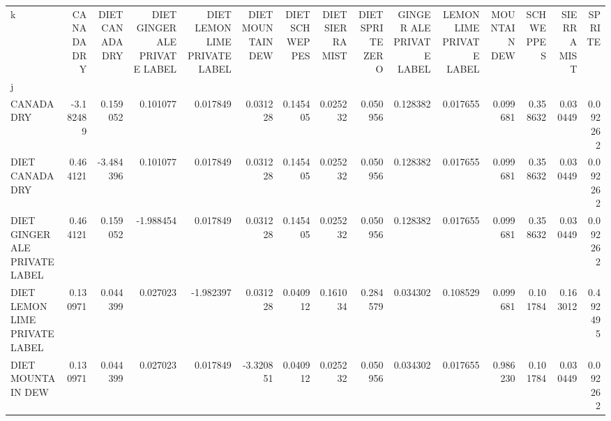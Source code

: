 \begin{tabular}{lrrrrrrrrrrrrrr}
\toprule
k &  CANADA DRY &  DIET CANADA DRY &  DIET GINGER ALE PRIVATE LABEL &  DIET LEMON LIME PRIVATE LABEL &  DIET MOUNTAIN DEW &  DIET SCHWEPPES &  DIET SIERRA MIST &  DIET SPRITE ZERO &  GINGER ALE PRIVATE LABEL &  LEMON LIME PRIVATE LABEL &  MOUNTAIN DEW &  SCHWEPPES &  SIERRA MIST &    SPRITE \\
j                             &             &                  &                                &                                &                    &                 &                   &                   &                           &                           &               &            &              &           \\
\midrule
CANADA DRY                    &   -3.182489 &         0.159052 &                       0.101077 &                       0.017849 &           0.031228 &        0.145405 &          0.025232 &          0.050956 &                  0.128382 &                  0.017655 &      0.099681 &   0.358632 &     0.030449 &  0.092262 \\
DIET CANADA DRY               &    0.464121 &        -3.484396 &                       0.101077 &                       0.017849 &           0.031228 &        0.145405 &          0.025232 &          0.050956 &                  0.128382 &                  0.017655 &      0.099681 &   0.358632 &     0.030449 &  0.092262 \\
DIET GINGER ALE PRIVATE LABEL &    0.464121 &         0.159052 &                      -1.988454 &                       0.017849 &           0.031228 &        0.145405 &          0.025232 &          0.050956 &                  0.128382 &                  0.017655 &      0.099681 &   0.358632 &     0.030449 &  0.092262 \\
DIET LEMON LIME PRIVATE LABEL &    0.130971 &         0.044399 &                       0.027023 &                      -1.982397 &           0.031228 &        0.040912 &          0.161034 &          0.284579 &                  0.034302 &                  0.108529 &      0.099681 &   0.101784 &     0.163012 &  0.492495 \\
DIET MOUNTAIN DEW             &    0.130971 &         0.044399 &                       0.027023 &                       0.017849 &          -3.320851 &        0.040912 &          0.025232 &          0.050956 &                  0.034302 &                  0.017655 &      0.986230 &   0.101784 &     0.030449 &  0.092262 \\

\end{tabular}
